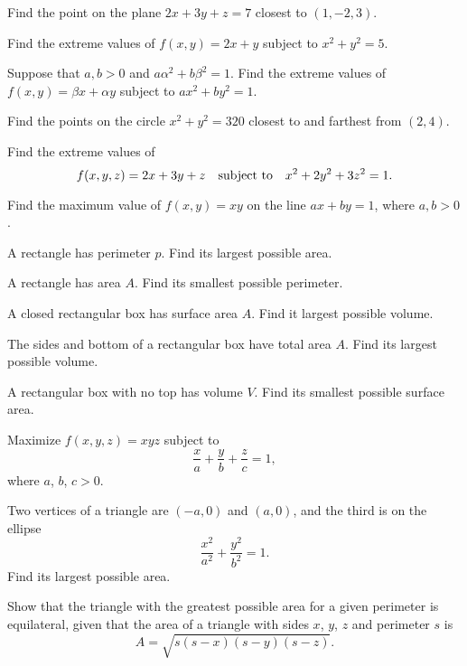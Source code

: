 \documentclass{article}
\newcounter{exercise}
\newenvironment{exerciselist}{\begin{list}{\bf \arabic{exercise}.}
{\topsep 10pt\partopsep 0pt\labelwidth 16pt
\labelsep 12pt\leftmargin 28pt
\itemsep 8pt\usecounter{exercise}}}{\end{list}}
\begin{document}
\begin{exerciselist}
\item\label{exer:1}
Find the point on the plane $2x+3y+z=7$ closest to $(1,-2,3)$.

\item\label{exer:2}
Find the extreme values of $f(x,y)=2x+y$ subject to $x^{2}+y^{2}=5$.

\item\label{exer:3}
Suppose that $a,b>0$ and $a\alpha^{2}+b\beta^{2}=1$. Find the extreme
values of
$f(x,y)=\beta x+\alpha y$ subject to $ax^{2}+by^{2}=1$.

\item\label{exer:4}
Find the points on the circle $x^{2}+y^{2}=320$  closest to and
farthest from $(2,4)$.

\item\label{exer:5}
Find the extreme values of
$$
f(x,y,z)=2x+3y+z\text{\quad subject to\quad}
x^{2}+2y^{2}+3z^{2}=1.
$$

\item\label{exer:6}
Find the maximum value of $f(x,y)=xy$ on the line $ax+by=1$, where $a,b>0$.

\item\label{exer:7}
A rectangle has perimeter $p$. Find  its largest possible area.

\item\label{exer:8}
A rectangle has area $A$. Find its  smallest possible perimeter.

\item\label{exer:9}
A closed rectangular box has surface area $A$.
Find it largest possible volume.

\item\label{exer:10}
The sides and bottom of a rectangular box have total area $A$. Find  its
largest possible volume.

\item\label{exer:11}
A rectangular box with no top has volume $V$. Find
its smallest possible   surface area.

\item\label{exer:12} Maximize $f(x,y,z)=xyz$ subject to $$
\frac{x}{a}+\frac{y}{b}+\frac{z}{c}=1, $$ where $a$, $b$, $c>0$.

\item\label{exer:13}
Two vertices of a triangle are $(-a,0)$ and $(a,0)$, and the third
is on the ellipse
$$
\frac{x^{2}}{a^{2}}+\frac{y^{2}}{b^{2}}=1.
$$
Find its largest possible area.

\item\label{exer:14}
 Show that the triangle with the greatest possible area for a
given perimeter is equilateral, given that the area of
a triangle with sides $x$, $y$, $z$ and perimeter $s$ is
$$
A= \sqrt{s(s-x)(s-y)(s-z)}.
$$


\end{exerciselist}
\end{document}
